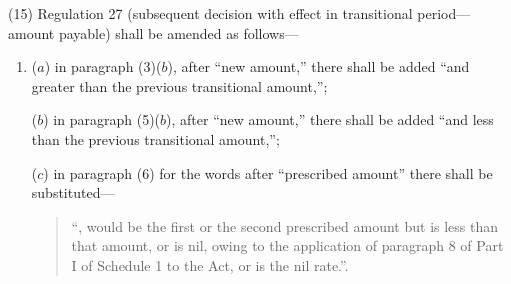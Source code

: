 \documentclass[12pt,a4paper]{article}
\begin{document}
(15) Regulation 27 (subsequent decision with effect in transitional period—amount payable) shall be amended as follows—
\begin{enumerate}\item[]
($a$) in paragraph (3)($b$), after “new amount,” there shall be added “and greater than the previous transitional amount,”;

($b$) in paragraph (5)($b$), after “new amount,” there shall be added “and less than the previous transitional amount,”;

($c$) in paragraph (6) for the words after “prescribed amount” there shall be substituted—
\begin{quotation}
    “, would be the first or the second prescribed amount but is less than that amount, or is nil, owing to the application of paragraph 8 of Part I of Schedule 1 to the Act, or is the nil rate.”. 
\end{quotation}
\end{enumerate}
\end{document}
